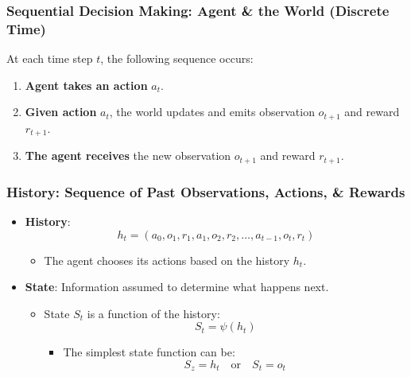 \subsubsection{Sequential Decision Making: Agent \& the World (Discrete Time)}
\begin{definition}
    At each time step \( t \), the following sequence occurs:
    \begin{enumerate}
        \item \textbf{Agent takes an action} \( a_t \).
        \item \textbf{Given action} \( a_t \), the world updates and emits observation \( o_{t+1} \) and reward \( r_{t+1} \).
        \item \textbf{The agent receives} the new observation \( o_{t+1} \) and reward \( r_{t+1} \).
    \end{enumerate}
\end{definition}

\subsubsection{History: Sequence of Past Observations, Actions, \& Rewards}
\begin{definition}
    \begin{itemize}
        \item \textbf{History}:
        \[
        h_t = (a_0, o_1, r_1, a_1, o_2, r_2, \ldots, a_{t-1}, o_t, r_t)
        \]
        \begin{itemize}
            \item The agent chooses its actions based on the history \( h_t \).
        \end{itemize}
        
        \item \textbf{State}: Information assumed to determine what happens next.
        \begin{itemize}
            \item State \( S_t \) is a function of the history:
            \[
            S_t = \psi(h_t)
            \]
            \begin{itemize}
                \item The simplest state function can be:
                \[
                S_z = h_t \quad \text{or} \quad S_t = o_t
                \]
            \end{itemize}
        \end{itemize}
    \end{itemize}
\end{definition}


